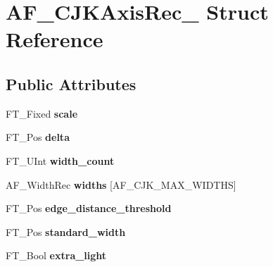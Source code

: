 \hypertarget{struct_a_f___c_j_k_axis_rec__}{}\section{A\+F\+\_\+\+C\+J\+K\+Axis\+Rec\+\_\+ Struct Reference}
\label{struct_a_f___c_j_k_axis_rec__}
\subsection*{Public Attributes}
\begin{DoxyCompactItemize}
\item 
\mbox{\label{struct_a_f___c_j_k_axis_rec___a4d6df84b7d89a3259abb8b189843776b}} 
F\+T\+\_\+\+Fixed {\bfseries scale}
\item 
\mbox{\label{struct_a_f___c_j_k_axis_rec___aaf3209544da6f08aa1079f871dba436e}} 
F\+T\+\_\+\+Pos {\bfseries delta}
\item 
\mbox{\label{struct_a_f___c_j_k_axis_rec___a297231b63842fb002e87623d4682b4f7}} 
F\+T\+\_\+\+U\+Int {\bfseries width\+\_\+count}
\item 
\mbox{\label{struct_a_f___c_j_k_axis_rec___ab78b56cea9f5a957e1d575e87b272fc4}} 
A\+F\+\_\+\+Width\+Rec {\bfseries widths} \mbox{[}A\+F\+\_\+\+C\+J\+K\+\_\+\+M\+A\+X\+\_\+\+W\+I\+D\+T\+HS\mbox{]}
\item 
\mbox{\label{struct_a_f___c_j_k_axis_rec___a830af0400bf97d6f649de1f099db6146}} 
F\+T\+\_\+\+Pos {\bfseries edge\+\_\+distance\+\_\+threshold}
\item 
\mbox{\label{struct_a_f___c_j_k_axis_rec___a467289850108e1c9cf051fc2aede25d4}} 
F\+T\+\_\+\+Pos {\bfseries standard\+\_\+width}
\item 
\mbox{\label{struct_a_f___c_j_k_axis_rec___abdf07ba39eef4ba3f206a7dd6fc1f832}} 
F\+T\+\_\+\+Bool {\bfseries extra\+\_\+light}
\item 
\mbox{\label{struct_a_f___c_j_k_axis_rec___ad65e2fcc420636af83b7bfeb4855817c}} 

\end{DoxyCompactItemize}
